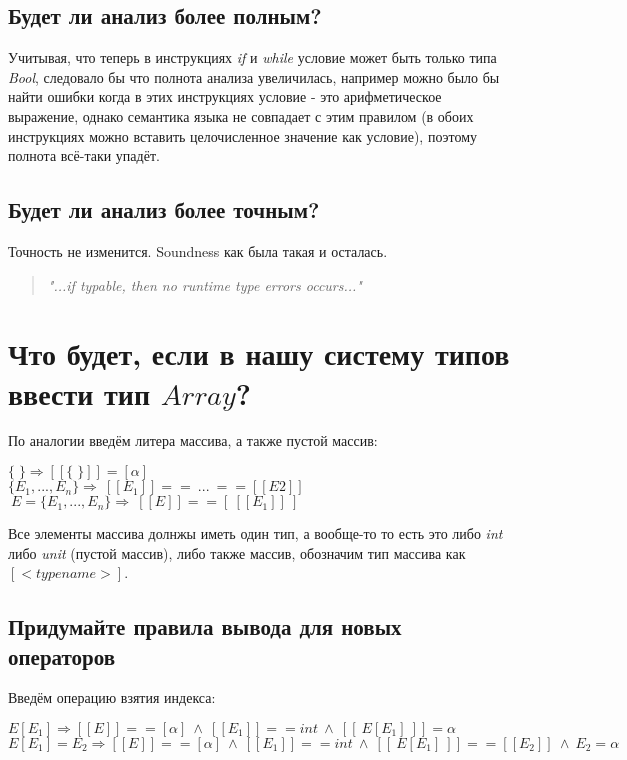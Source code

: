 \documentclass{report}
\begin{document}
\subsection{Будет ли анализ более полным?}

Учитывая, что теперь в инструкциях \textit{if} и \textit{while} условие может быть только типа \textit{Bool}, следовало бы что полнота анализа увеличилась, например можно было бы найти ошибки когда в этих инструкциях условие - это арифметическое выражение, однако семантика языка не совпадает с этим правилом (в обоих инструкциях можно вставить целочисленное значение как условие), поэтому полнота всё-таки упадёт.

\subsection{Будет ли анализ более точным?}

Точность не изменится. Soundness как была такая и осталась.

\begin{quote}
   \textit{ "...if typable, then no runtime type errors occurs..." }
\end{quote}

\section{Что будет, если в нашу систему типов ввести тип \(Array\)?}

По аналогии введём литера массива, а также пустой массив:

\begin{center}
    \(\{ \; \} \Rightarrow [[\{ \; \}]] = [\alpha]\) \\
    \(\{E_1,...,E_n\} \Rightarrow \ [[E_1]] == \ ... \  == [[E2]] \) \\
    \(\ E = \{E_1,...,E_n\} \Rightarrow \ [[E]] == [ \ [[E_1]] \ ] \)
\end{center}

Все элементы массива долнжы иметь один тип, а вообще-то то есть это либо \textit{int} либо \textit{unit} (пустой массив), либо также массив, обозначим тип массива как \([<typename>] \).

\subsection{Придумайте правила вывода для новых операторов}
Введём операцию взятия индекса:

\begin{center}
    \( E[E_1] \Rightarrow [[E]] == [\alpha] \ \wedge \ [[E_1]] == int \ \wedge \ [[ \ E[E_1]\  ]] = \alpha\) \\
    \( E[E_1] = E_2 \Rightarrow [[E]] == [\alpha] \ \wedge \ [[E_1]] == int \ \wedge \ [[ \ E[E_1] \ ]] == [[E_2]] \  \wedge \ E_2 = \alpha\) \\
\end{center}
\end{document}
